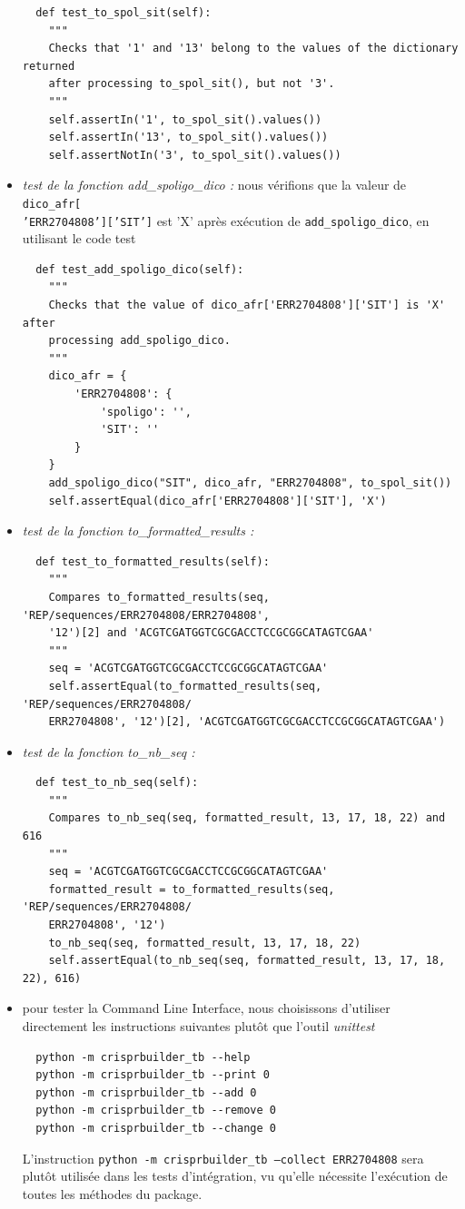 \documentclass[twoside,a4paper,11pt,frenchb,openany]{report}
\begin{document}
\begin{itemize}
\begin{verbatim}
  def test_to_spol_sit(self):
    """
    Checks that '1' and '13' belong to the values of the dictionary returned
    after processing to_spol_sit(), but not '3'.
    """
    self.assertIn('1', to_spol_sit().values())
    self.assertIn('13', to_spol_sit().values())
    self.assertNotIn('3', to_spol_sit().values())
\end{verbatim}
\item \textit{test de la fonction add\_spoligo\_dico :} nous vérifions que la valeur de \texttt{dico\_afr[\\'ERR2704808']['SIT']} est 'X' après exécution de \texttt{add\_spoligo\_dico}, en utilisant le code test
\begin{verbatim}
  def test_add_spoligo_dico(self):
    """
    Checks that the value of dico_afr['ERR2704808']['SIT'] is 'X' after
    processing add_spoligo_dico.
    """
    dico_afr = {
        'ERR2704808': {
            'spoligo': '',
            'SIT': ''
        }
    }
    add_spoligo_dico("SIT", dico_afr, "ERR2704808", to_spol_sit())
    self.assertEqual(dico_afr['ERR2704808']['SIT'], 'X')
\end{verbatim}
\item \textit{test de la fonction to\_formatted\_results :}
\begin{verbatim}
  def test_to_formatted_results(self):
    """
    Compares to_formatted_results(seq, 'REP/sequences/ERR2704808/ERR2704808',
    '12')[2] and 'ACGTCGATGGTCGCGACCTCCGCGGCATAGTCGAA'
    """
    seq = 'ACGTCGATGGTCGCGACCTCCGCGGCATAGTCGAA'
    self.assertEqual(to_formatted_results(seq, 'REP/sequences/ERR2704808/
    ERR2704808', '12')[2], 'ACGTCGATGGTCGCGACCTCCGCGGCATAGTCGAA')
\end{verbatim}
\item \textit{test de la fonction to\_nb\_seq :}
\begin{verbatim}
  def test_to_nb_seq(self):
    """
    Compares to_nb_seq(seq, formatted_result, 13, 17, 18, 22) and 616
    """
    seq = 'ACGTCGATGGTCGCGACCTCCGCGGCATAGTCGAA'
    formatted_result = to_formatted_results(seq, 'REP/sequences/ERR2704808/
    ERR2704808', '12')
    to_nb_seq(seq, formatted_result, 13, 17, 18, 22)
    self.assertEqual(to_nb_seq(seq, formatted_result, 13, 17, 18, 22), 616)
\end{verbatim}

\item pour tester la Command Line Interface, nous choisissons d'utiliser directement les instructions suivantes plutôt que l'outil \textit{unittest}
\begin{verbatim}
  python -m crisprbuilder_tb --help
  python -m crisprbuilder_tb --print 0
  python -m crisprbuilder_tb --add 0
  python -m crisprbuilder_tb --remove 0
  python -m crisprbuilder_tb --change 0
\end{verbatim}
L'instruction \texttt{python -m crisprbuilder\_tb --collect ERR2704808} sera plutôt utilisée dans les tests d'intégration, vu qu'elle nécessite l'exécution de toutes les méthodes du package.
\end{itemize}
\end{document}
